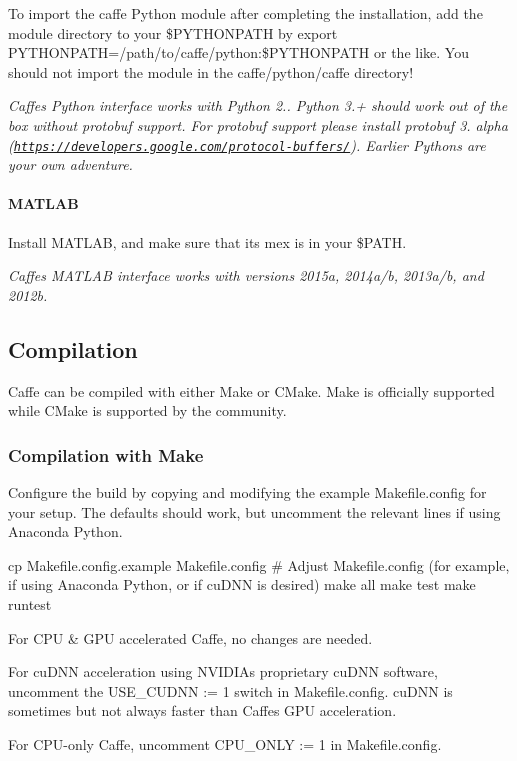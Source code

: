 To import the {\ttfamily caffe} Python module after completing the installation, add the module directory to your {\ttfamily \$\+P\+Y\+T\+H\+O\+N\+P\+A\+TH} by {\ttfamily export P\+Y\+T\+H\+O\+N\+P\+A\+TH=/path/to/caffe/python\+:\$\+P\+Y\+T\+H\+O\+N\+P\+A\+TH} or the like. You should not import the module in the {\ttfamily caffe/python/caffe} directory!

{\itshape Caffe\textquotesingle{}s Python interface works with Python 2.. Python 3.+ should work out of the box without protobuf support. For protobuf support please install protobuf 3. alpha (\href{https://developers.google.com/protocol-buffers/}{\tt https\+://developers.\+google.\+com/protocol-\/buffers/}). Earlier Pythons are your own adventure.}

\paragraph*{M\+A\+T\+L\+AB}

Install M\+A\+T\+L\+AB, and make sure that its {\ttfamily mex} is in your {\ttfamily \$\+P\+A\+TH}.

{\itshape Caffe\textquotesingle{}s M\+A\+T\+L\+AB interface works with versions 2015a, 2014a/b, 2013a/b, and 2012b.}

\subsection*{Compilation}

Caffe can be compiled with either Make or C\+Make. Make is officially supported while C\+Make is supported by the community.

\subsubsection*{Compilation with Make}

Configure the build by copying and modifying the example {\ttfamily Makefile.\+config} for your setup. The defaults should work, but uncomment the relevant lines if using Anaconda Python. \begin{DoxyVerb}cp Makefile.config.example Makefile.config
# Adjust Makefile.config (for example, if using Anaconda Python, or if cuDNN is desired)
make all
make test
make runtest
\end{DoxyVerb}



\begin{DoxyItemize}
\item For C\+PU \& G\+PU accelerated Caffe, no changes are needed.
\item For cu\+D\+NN acceleration using N\+V\+I\+D\+IA\textquotesingle{}s proprietary cu\+D\+NN software, uncomment the {\ttfamily U\+S\+E\+\_\+\+C\+U\+D\+NN \+:= 1} switch in {\ttfamily Makefile.\+config}. cu\+D\+NN is sometimes but not always faster than Caffe\textquotesingle{}s G\+PU acceleration.
\item For C\+P\+U-\/only Caffe, uncomment {\ttfamily C\+P\+U\+\_\+\+O\+N\+LY \+:= 1} in {\ttfamily Makefile.\+config}.
\end{DoxyItemize}

